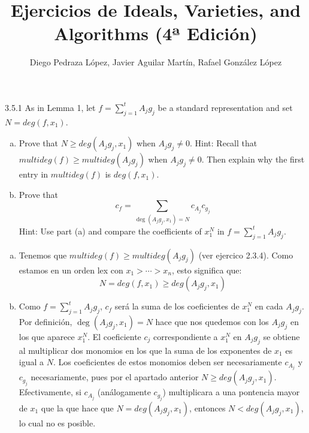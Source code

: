 \documentclass[twoside]{article}
\begin{document}
\title{Ejercicios de Ideals, Varieties, and Algorithms (4ª Edición)}
\author{Diego Pedraza López, Javier Aguilar Martín, Rafael González López}
\maketitle

\begin{ejercicio}{3.5.1}
As in Lemma 1, let $f = \sum_{j=1}^t A_j g_j$ be a standard representation and set $N = deg(f,x_1)$.
\begin{enumerate}[a.]
\item Prove that $N \geq deg(A_j g_j, x_1)$ when $A_j g_j \neq 0$.
Hint: Recall that $multideg(f) \geq multideg(A_j g_j)$ when $A_j g_j \neq 0$.
Then explain why the first entry in $multideg(f)$ is $deg(f,x_1)$.
\item Prove that
\[ c_f = \sum_{\deg(A_j g_j, x_1) = N} c_{A_j}c_{g_j} \]
Hint: Use part (a) and compare the coefficients of $x_1^N$ in $f = \sum_{j=1}^t A_j g_j$.
\end{enumerate}
\end{ejercicio}
\begin{solucion}\mbox{}
\begin{enumerate}[(a)]
\item Tenemos que $multideg(f) \geq multideg(A_j g_j)$ (ver ejercico 2.3.4).
Como estamos en un orden lex con $x_1 > \cdots > x_n$, esto significa que:
\[ N = deg(f,x_1) \geq deg(A_j g_j, x_1) \]
\item Como $f = \sum_{j=1}^t A_j g_j$, $c_f$ será la suma de los coeficientes de $x_1^N$ en cada $ A_j g_j$. Por definición, $\deg(A_j g_j, x_1) = N$ hace que nos quedemos con los $A_jg_j$ en los que aparece $x_1^N$. El coeficiente $c_j$ correspondiente a $x_1^N$ en $A_jg_j$ se obtiene al multiplicar dos monomios en los que la suma de los exponentes de $x_1$ es igual a $N$. Los coeficientes de estos monomios deben ser necesariamente $c_{A_j}$ y $c_{g_j}$ necesariamente, pues por el apartado anterior $N \geq deg(A_j g_j, x_1)$. Efectivamente, si $c_{A_j}$ (análogamente $c_{g_j}$) multiplicara a una pontencia mayor de $x_1$ que la que hace que $N = deg(A_j g_j, x_1)$, entonces  $N < deg(A_j g_j, x_1)$, lo cual no es posible. 
\end{enumerate}
\end{solucion}

\newpage
\end{document}
